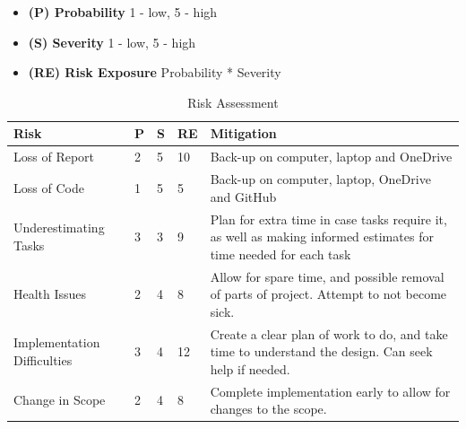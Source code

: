 \documentclass[12pt]{report}
\begin{document}
\begin{itemize}
    \item \textbf{(P) Probability} 1 - low, 5 - high
    \item \textbf{(S) Severity}  1 - low, 5 - high
    \item \textbf{(RE) Risk Exposure} Probability * Severity
\end{itemize}

\begin{table}[ht]
    \renewcommand{\arraystretch}{1.3}
    \caption{Risk Assessment} %
    \centering %
    \begin{tabular}{|p{3cm} | p{0.4cm} | p{0.4cm} | p{0.6cm} | p{8cm}|} %
        \hline\hline %
        \textbf{Risk}               & \textbf{P} & \textbf{S} & \textbf{RE} & \textbf{Mitigation}                                                                                              \\ [0.5ex] %
        \hline %
        Loss of Report              & 2          & 5          & 10          & Back-up on computer, laptop and OneDrive                                                                         \\ \hline %
        Loss of Code                & 1          & 5          & 5           & Back-up on computer, laptop, OneDrive and GitHub                                                                 \\ \hline
        Underestimating Tasks       & 3          & 3          & 9           & Plan for extra time in case tasks require it, as well as making informed estimates for time needed for each task \\ \hline
        Health Issues               & 2          & 4          & 8           & Allow for spare time, and possible removal of parts of project. Attempt to not become sick.                      \\ \hline
        Implementation Difficulties & 3          & 4          & 12          & Create a clear plan of work to do, and take time to understand the design. Can seek help if needed.              \\ \hline
        Change in Scope             & 2          & 4          & 8           & Complete implementation early to allow for changes to the scope.
        \\ \hline %
    \end{tabular}
    \label{table:risk} %
\end{table}
\end{document}

